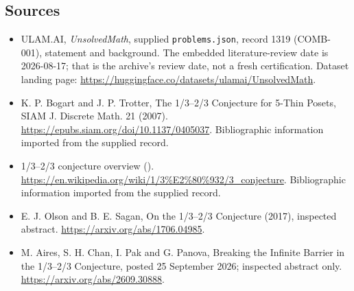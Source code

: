 \documentclass[11pt,a4paper]{article}
\begin{document}
\subsection{Sources}

{\small

\begin{itemize}

\item[\hypertarget{source:1319:1}{S1}] ULAM.AI, \emph{UnsolvedMath}, supplied \texttt{problems.json}, record 1319 (COMB-001), statement and background. The embedded literature-review date is 2026-08-17; that is the archive’s review date, not a fresh certification. Dataset landing page: \url{https://huggingface.co/datasets/ulamai/UnsolvedMath}.

\item[\hypertarget{source:1319:2}{S2}] K. P. Bogart and J. P. Trotter, The 1/3--2/3 Conjecture for 5-Thin Posets, SIAM J. Discrete Math. 21 (2007). \url{https://epubs.siam.org/doi/10.1137/0405037}. Bibliographic information imported from the supplied record.

\item[\hypertarget{source:1319:3}{S3}] 1/3--2/3 conjecture overview (). \url{https://en.wikipedia.org/wiki/1/3%E2%80%932/3_conjecture}. Bibliographic information imported from the supplied record.

\item[R1] E. J. Olson and B. E. Sagan, On the 1/3--2/3 Conjecture (2017), inspected abstract.
\url{https://arxiv.org/abs/1706.04985}.
\item[R2] M. Aires, S. H. Chan, I. Pak and G. Panova, Breaking the Infinite Barrier in the 1/3--2/3 Conjecture, posted 25 September 2026; inspected abstract only.
\url{https://arxiv.org/abs/2609.30888}.
\end{itemize}

}

\label{end:1319}
\end{document}
